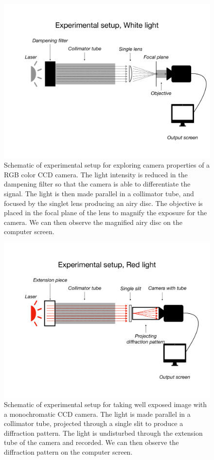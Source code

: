 \documentclass{emulateapj}
\begin{document}
\begin{figure}
	\centering
	\includegraphics[width=\linewidth]{./keynotes/exp_setup_white.pdf}
	\caption[Experimental setup white light]{Schematic of experimental setup for exploring camera properties of a RGB color CCD camera. The light intensity is reduced in the dampening filter so that the camera is able to differentiate the signal. The light is then made parallel in a collimator tube, and focused by the singlet lens producing an airy disc. The objective is placed in the focal plane of the lens to magnify the exposure for the camera. We can then observe the magnified airy disc on the computer screen.}
	\label{fig: Setup white}
\end{figure}

\begin{figure}
	\centering
	\includegraphics[width=\linewidth]{./keynotes/exp_setup_red.pdf}
	\caption[Experimental setup red light]{Schematic of experimental setup for taking well exposed image with a monochromatic CCD camera. The light is made parallel in a collimator tube, projected through a single slit to produce a diffraction pattern. The light is undisturbed through the extension tube of the camera and recorded. We can then observe the diffraction pattern on the computer screen.}
	\label{fig: Setup red}
\end{figure}
\end{document}
